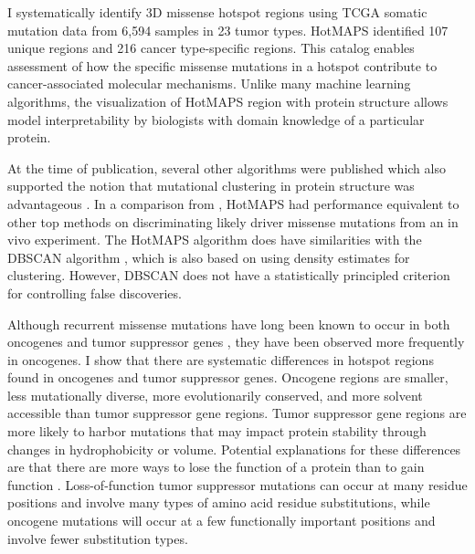 I systematically identify 3D missense hotspot regions using TCGA somatic mutation data from 6,594 samples in 23 tumor types. HotMAPS identified 107 unique regions and 216 cancer type-specific regions. This catalog enables assessment of how the specific missense mutations in a hotspot contribute to cancer-associated molecular mechanisms. Unlike many machine learning algorithms, the visualization of HotMAPS region with protein structure allows model interpretability by biologists with domain knowledge of a particular protein.

At the time of publication, several other algorithms were published which also supported the notion that mutational clustering in protein structure was advantageous \cite{RN133, RN131, RN132}. In a comparison from \cite{RN133}, HotMAPS had performance equivalent to other top methods on discriminating likely driver missense mutations from an in vivo experiment. The HotMAPS algorithm does have similarities with the DBSCAN algorithm \cite{RN117}, which is also based on using density estimates for clustering. However, DBSCAN does not have a statistically principled criterion for controlling false discoveries. 

Although recurrent missense mutations have long been known to occur in both oncogenes and tumor suppressor genes \cite{RN107}, they have been observed more frequently in oncogenes. I show that there are systematic differences in hotspot regions found in oncogenes and tumor suppressor genes. Oncogene regions are smaller, less mutationally diverse, more evolutionarily conserved, and more solvent accessible than tumor suppressor gene regions. Tumor suppressor gene regions are more likely to harbor mutations that may impact protein stability through changes in hydrophobicity or volume. Potential explanations for these differences are that there are more ways to lose the function of a protein than to gain function \cite{RN130}. Loss-of-function tumor suppressor mutations can occur at many residue positions and involve many types of amino acid residue substitutions, while oncogene mutations will occur at a few functionally important positions and involve fewer substitution types.

